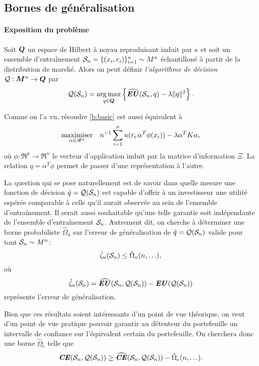 \subsection{Bornes de généralisation}
\label{b:gen}


\paragraph{Exposition du problème}

Soit $\Q$ un espace de Hilbert à noyau reproduisant induit par $\kappa$ et soit un ensemble
d'entraînement $\S_n = \{(x_i,r_i)\}_{i=1}^n \sim M^n$ échantilloné à partir de la
distribution de marché. Alors on peut définir \textit{l'algorithme de décision}
$\alg:\M^n \to \Q$ par
\begin{equation}
  \label{b:basic}
  \alg(\S_n) = \argmax_{q \in \Q} \left\{\widehat\EU(\S_n,q) - \lambda\nq{q}^2\right\}.
\end{equation}

Comme on l'a vu, résoudre \eqref{b:basic} est aussi équivalent à
\begin{equation}
  \maximizeEquation[\alpha \in \Re^n]{n^{-1} \sumi u(r_i\,\alpha^T\phi(x_i)) - \lambda \alpha^TK\alpha,}
\end{equation}
où $\phi:\Re^p \to \Re^n$ le vecteur d'application induit par la matrice d'information $\Xi$. La
relation $q = \alpha^T\phi$ permet de passer d'une représentation à l'autre.

La question qui se pose naturellement est de savoir dans quelle mesure une fonction de
décision $\hat q = \alg(\S_n)$ est capable d'offrir à un investisseur une utilité espérée
comparable à celle qu'il aurait observée au sein de l'ensemble d'entraînement. Il serait
aussi souhaitable qu'une telle garantie soit indépendante de l'ensemble d'entraînement
$\S_n$. Autrement dit, on cherche à déterminer une borne probabiliste $\hat\Omega_u$ sur l'erreur de
généralisation de $\hat q = \alg(\S_n)$ valide pour tout $\S_n \sim M^n$:
\begin{equation}
 \hat\zeta_u(\S_n) \leq \hat\Omega_u(n,\ldots),
\end{equation}
où
\begin{equation}
  \label{b:zeta}
  \hat\zeta_u(\S_n) =  \hEU(\S_n,\alg(\S_n)) - \EU(\alg(\S_n))
\end{equation}
représente l'erreur de généralisation.

Bien que ces résultats soient intéressants d'un point de vue théorique, on veut d'un point
de vue pratique pouvoir garantir au détenteur du portefeuille un intervalle de confiance
sur l'équivalent certain du portefeuille. On cherchera donc une borne $\hat\Omega_e$ telle que
\begin{equation}
  \CE(\S_n,\alg(\S_n)) \geq \hCE(\S_n,\alg(\S_n)) - \hat\Omega_e(n,\ldots).
\end{equation}

